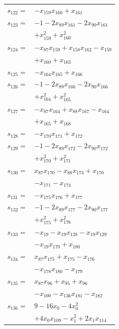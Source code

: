 \begin{longtable}{@{}r@{\;}l@{}}
\(s_{122}=\) & \(\displaystyle -x_{159}x_{160} +x_{161}\) \\[3pt]
\(s_{123}=\) & \(\displaystyle -1 -2x_{89}x_{161} -2x_{90}x_{161}\) \\
 & \(\displaystyle +x_{159}^{2} +x_{160}^{2}\) \\[3pt]
\(s_{124}=\) & \(\displaystyle -x_{87}x_{159} +x_{158}x_{162} -x_{159}\) \\
 & \(\displaystyle +x_{160} +x_{163}\) \\[3pt]
\(s_{125}=\) & \(\displaystyle -x_{164}x_{165} +x_{166}\) \\[3pt]
\(s_{126}=\) & \(\displaystyle -1 -2x_{89}x_{166} -2x_{90}x_{166}\) \\
 & \(\displaystyle +x_{164}^{2} +x_{165}^{2}\) \\[3pt]
\(s_{127}=\) & \(\displaystyle -x_{87}x_{164} +x_{88}x_{167} -x_{164}\) \\
 & \(\displaystyle +x_{165} +x_{168}\) \\[3pt]
\(s_{128}=\) & \(\displaystyle -x_{170}x_{171} +x_{172}\) \\[3pt]
\(s_{129}=\) & \(\displaystyle -1 -2x_{89}x_{172} -2x_{90}x_{172}\) \\
 & \(\displaystyle +x_{170}^{2} +x_{171}^{2}\) \\[3pt]
\(s_{130}=\) & \(\displaystyle x_{87}x_{170} -x_{88}x_{173} +x_{170}\) \\
 & \(\displaystyle -x_{171} -x_{174}\) \\[3pt]
\(s_{131}=\) & \(\displaystyle -x_{175}x_{176} +x_{177}\) \\[3pt]
\(s_{132}=\) & \(\displaystyle -1 -2x_{89}x_{177} -2x_{90}x_{177}\) \\
 & \(\displaystyle +x_{175}^{2} +x_{176}^{2}\) \\[3pt]
\(s_{133}=\) & \(\displaystyle -x_{19} -x_{19}x_{128} -x_{19}x_{129}\) \\
 & \(\displaystyle -x_{19}x_{179} +x_{180}\) \\[3pt]
\(s_{134}=\) & \(\displaystyle x_{87}x_{175} +x_{175} -x_{176}\) \\
 & \(\displaystyle -x_{178}x_{180} -x_{179}\) \\[3pt]
\(s_{135}=\) & \(\displaystyle x_{87}x_{96} +x_{95} +x_{96}\) \\
 & \(\displaystyle -x_{100} -x_{136}x_{181} -x_{182}\) \\[3pt]
\(s_{136}=\) & \(\displaystyle 9 -16x_{0} -4x_{0}^{2}\) \\
 & \(\displaystyle +4x_{0}x_{109} -x_{1}^{2} +2x_{1}x_{114}\) \\

\end{longtable}
